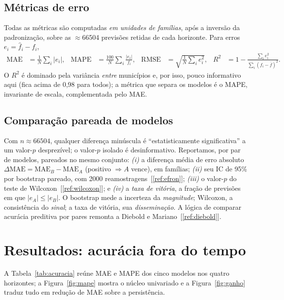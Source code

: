 \documentclass[12pt,a4paper,oneside]{article}
\newcommand{\C}[1]{[\ref{#1}]}
\begin{document}
\subsection{Métricas de erro}

Todas as métricas são computadas \emph{em unidades de famílias}, após a
inversão da padronização, sobre as $\approx$\num{66504} previsões retidas de
cada horizonte. Para erros $e_i=\widehat{f}_i-f_i$,
\begin{align}
\mathrm{MAE}  &= \frac{1}{N}\sum_{i}\lvert e_i\rvert, &
\mathrm{MAPE} &= \frac{100}{N}\sum_{i}\frac{\lvert e_i\rvert}{f_i}, &
\mathrm{RMSE} &= \sqrt{\frac{1}{N}\sum_{i}e_i^2}, &
R^2 &= 1-\frac{\sum_i e_i^2}{\sum_i (f_i-\bar f)^2}.
\end{align}
O $R^2$ é dominado pela variância \emph{entre} municípios e, por isso,
pouco informativo aqui (fica acima de 0,98 para todos); a métrica que
separa os modelos é o MAPE, invariante de escala, complementada pelo MAE.

\subsection{Comparação pareada de modelos}

Com $n\approx\num{66504}$, qualquer diferença minúscula é
``estatisticamente significativa'' a um valor-$p$ desprezível; o
valor-$p$ isolado é desinformativo. Reportamos, por par de modelos,
pareados no mesmo conjunto: \emph{(i)} a diferença média de erro absoluto
$\Delta\mathrm{MAE}=\mathrm{MAE}_B-\mathrm{MAE}_A$ (positivo $\Rightarrow A$
vence), em famílias; \emph{(ii)} seu IC de 95\% por bootstrap pareado, com
\num{2000} reamostragens~\C{ref:efron}; \emph{(iii)} o valor-$p$ do teste
de Wilcoxon~\C{ref:wilcoxon}; e \emph{(iv)} a \emph{taxa de vitória}, a
fração de previsões em que $\lvert e_A\rvert\le\lvert e_B\rvert$. O
bootstrap mede a incerteza da \emph{magnitude}; Wilcoxon, a consistência do
\emph{sinal}; a taxa de vitória, sua \emph{disseminação}. A lógica de
comparar acurácia preditiva por pares remonta a Diebold e
Mariano~\C{ref:diebold}.

\section{Resultados: acurácia fora do tempo}
\label{sec:resultados}

A Tabela~\ref{tab:acuracia} reúne MAE e MAPE dos cinco modelos nos quatro
horizontes; a Figura~\ref{fig:mape} mostra o núcleo univariado e a
Figura~\ref{fig:ganho} traduz tudo em redução de MAE sobre a persistência.
\end{document}
